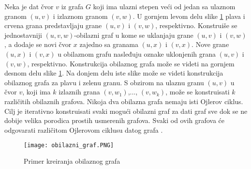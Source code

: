 \documentclass[12pt,oneside]{memoir}
\begin{document}
Neka je dat čvor $v$ iz grafa $G$ koji ima ulazni stepen veći od jedan sa ulaznom granom $(u, v)$ i izlaznom granom $(v, w)$. U gornjem levom delu slike \ref{fig:obilazniGraf} plava i crvena grana predstavljaju grane $(u, v)$ i $(v, w)$, respektivno. Konstruiše se jednostavniji $(u, v, w)$-obilazni graf u kome se uklanjaju grane $(u, v)$ i $(v, w)$, a dodaje se novi čvor $x$ zajedno sa granama $(u, x)$ i $(v, x)$. Nove grane $(u, x)$ i $(v, x)$ u obilaznom grafu nasleđuju oznake uklonjenih grana $(u, v)$ i $(v, w)$, respektivno. Konstrukcija obilaznog grafa može se videti na gornjem desnom delu slike \ref{fig:obilazniGraf}. Na donjem delu iste slike može se videti konstrukcija obilaznog grafa za plavu i zelenu granu. S obzirom na ulaznu granu $(u, v)$ u čvor $v$, koji ima $k$ izlaznih grana $(v, w_1)$,..., $(v, w_k)$, može se konstruisati $k$ različitih obilaznih grafova. Nikoja dva obilazna grafa nemaju isti Ojlerov ciklus. Cilj je iterativno konstruisati svaki mogući obilazni graf za dati graf sve dok se ne dobije velika porodica prostih usmerenih grafova. Svaki od ovih grafova će odgovarati različitom Ojlerovom ciklusu datog grafa \cite{bioinformaticsAlg}.

\begin{figure}[h]
\centering
\texttt{[image: obilazni\_graf.PNG]}
\caption{Primer kreiranja obilaznog grafa \cite{bioinformaticsAlg}}
\label{fig:obilazniGraf}
\end{figure}
\end{document}
